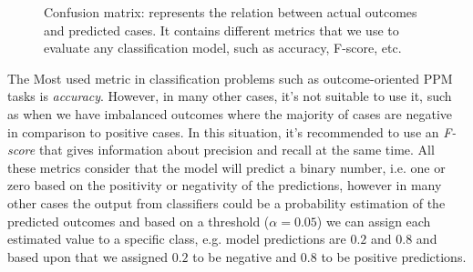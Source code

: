 \begin{figure}[htb]
	\begin{center}
		\caption[Confusion matrix:]{Confusion matrix: represents the relation between actual outcomes and predicted cases. It contains different metrics that we use to evaluate any classification model, such as accuracy, F-score, etc.}
		\label{fig:cm}
	\end{center}
\end{figure}


The Most used metric in classification problems such as outcome-oriented PPM tasks is \textit{accuracy}. However, in many other cases, it’s not suitable to use it, such as when we have imbalanced outcomes where the majority of cases are negative in comparison to positive cases. In this situation, it’s recommended to use an \textit{F-score} that gives information about precision and recall at the same time.  All these metrics consider that the model will predict a binary number, i.e. one or zero based on the positivity or negativity of the predictions, however in many other cases the output from classifiers could be a probability estimation of the predicted outcomes and based on a threshold ($\alpha = 0.05$) we can assign each estimated value to a specific class, e.g. model predictions are $0.2$ and $0.8$ and based upon that we assigned $0.2$ to be negative and $0.8$ to be positive predictions.


